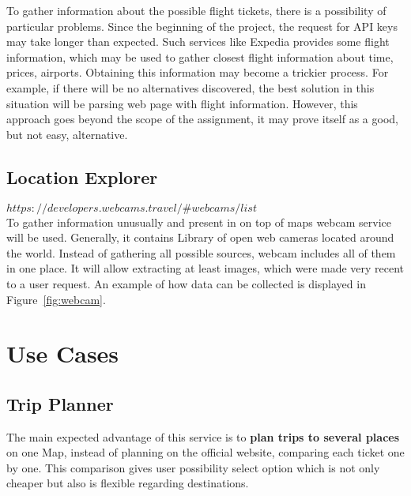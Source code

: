 \documentclass[12pt]{article}
\numberwithin{equation}{section} %
\numberwithin{figure}{section} %
\numberwithin{table}{section} %
\begin{document}
		To gather information about the possible flight tickets, there is a possibility of particular problems. Since the beginning of the project, the request for API keys may take longer than expected. Such services like Expedia provides some flight information, which may be used to gather closest flight information about time, prices, airports. Obtaining this information may become a trickier process. For example, if there will be no alternatives discovered, the best solution in this situation will be parsing web page with flight information. However, this approach goes beyond the scope of the assignment, it may prove itself as a good, but not easy, alternative.\\
	\subsection{Location Explorer}
		$ https://developers.webcams.travel/\#webcams/list $ \\
		
		To gather information unusually and present in on top of maps webcam service will be used. Generally, it contains Library of open web cameras located around the world. Instead of gathering all possible sources, webcam includes all of them in one place. It will allow extracting at least images, which were made very recent to a user request. An example of how data can be collected is displayed in Figure~\ref{fig:webcam}.
\section{Use Cases}
	\subsection{Trip Planner}
	The main expected advantage of this service is to \textbf{plan trips to several places} on one Map, instead of planning on the official website, comparing each ticket one by one. This comparison gives user possibility select option which is not only cheaper but also is flexible regarding destinations.
	
\end{document}
